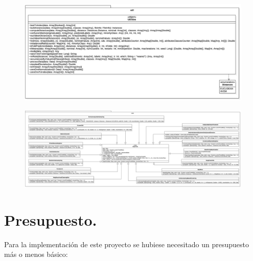 \begin{figure}[H]
\includegraphics[scale=0.23, angle=90]{./imagenes/3_clases_detalles_pt2.jpg}
\end{figure}

\begin{figure}[H]
\centering
\includegraphics[scale=0.13, angle=90]{./imagenes/3_clases_detalles_pt3.jpg}
\end{figure}

\section{Presupuesto.} \label{sec:presupuesto}

Para la implementación de este proyecto se hubiese necesitado un presupuesto más o menos básico:


